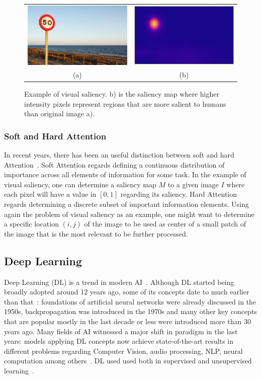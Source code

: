 \documentclass[12pt]{article}
\begin{document}
\begin{figure}
\begin{center}
		\begin{tabular} {cc}
		\includegraphics[width=0.35\linewidth]{./img/traffic_sign_s.jpg} &
		\includegraphics[width=0.35\linewidth]{./img/traffic_sign_m.jpg}\\
        (a) & (b)
		\end{tabular}
\caption{Example of visual saliency.
    b) is the saliency map where higher intensity pixels represent
    regions that are more salient to humans than original image a).}
\label{fig:saliency}
\end{center}
\end{figure}

\subsubsection{Soft and Hard Attention}
In recent years, there has been an useful distinction between
soft and hard Attention~\cite{ref:att-survey}.
Soft Attention regards defining a continuous distribution of importance
across all elements of information for some task.
In the example of visual saliency, one can determine a saliency map $M$
to a given image $I$ where each pixel will have a value in $[0, 1]$
regarding its saliency.
Hard Attention regards determining a discrete subset of
important information elements.
Using again the problem of visual saliency as an example,
one might want to determine a specific location $(i, j)$ of the image
to be used as center of a small patch of the image that is the most
relevant to be further processed.

\subsection{Deep Learning}
Deep Learning (DL) is a trend in modern AI~\cite{ref:dl}.
Although DL started being broadly adopted around 12 years ago,
some of its concepts date to much earlier than that~\cite{ref:dl}:
foundations of artificial neural networks were already discussed
in the 1950s, backpropagation was introduced in the 1970s
and many other key concepts that are popular mostly in the last decade or less
were introduced more than 30 years ago.
Many fields of AI witnessed a major shift in paradigm
in the last years: models applying DL concepts now achieve state-of-the-art
results in different problems regarding Computer Vision,
audio processing, NLP, neural computation among others~\cite{ref:dl-book}.
DL used used both in supervised and unsupervised learning~\cite{ref:dl}.
\end{document}
